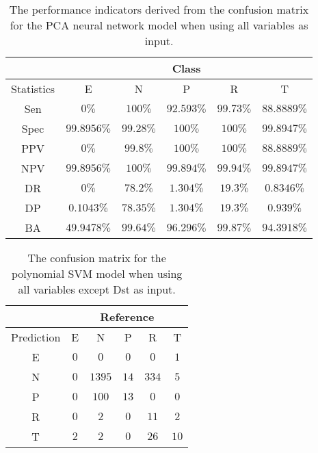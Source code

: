\begin{table}[!ht]
	\centering
	\begin{tabular}{|c|c|c|c|c|c|}
		\hline
		 & \multicolumn{5}{c|}{Class} \\ \hline
		Statistics & E & N & P & R & T \\ \hline
		Sen & $0\%$ & $100\%$ & $92.593\%$ & $99.73\%$ & $88.8889\%$ \\ \hline
		Spec & $99.8956\%$ & $99.28\%$ & $100\%$ & $100\%$ & $99.8947\%$ \\ \hline
		PPV & $0\%$ & $99.8\%$ & $100\%$ & $100\%$ & $88.8889\%$ \\ \hline
		NPV & $99.8956\%$ & $100\%$ & $99.894\%$ & $99.94\%$ & $99.8947\%$ \\ \hline
		DR & $0\%$ & $78.2\%$ & $1.304\%$ & $19.3\%$ & $0.8346\%$ \\ \hline
		DP & $0.1043\%$ & $78.35\%$ & $1.304\%$ & $19.3\%$ & $0.939\%$ \\ \hline
		BA & $49.9478\%$ & $99.64\%$ & $96.296\%$ & $99.87\%$ & $94.3918\%$ \\ \hline
	\end{tabular}
	\caption{The performance indicators derived from the confusion matrix for the PCA neural network model when using all variables as input.}
	\label{tab:cs:reverse:all:pcaNNet}
\end{table}

\begin{table}[!ht]
	\centering
	\begin{tabular}{|c|c|c|c|c|c|}
		\hline
		 & \multicolumn{5}{|c|}{Reference} \\ \hline
		 Prediction & E & N & P & R & T \\ \hline
		 E & $0$ & $0$ & $0$ & $0$ & $1$ \\ \hline
		 N & $0$ & $1395$ & $14$ & $334$ & $5$ \\ \hline
		 P & $0$ & $100$ & $13$ & $0$ & $0$ \\ \hline
		 R & $0$ & $2$ & $0$ & $11$ & $2$ \\ \hline
		 T & $2$ & $2$ & $0$ & $26$ & $10$ \\ \hline
	\end{tabular}
	\caption{The confusion matrix for the polynomial SVM model when using all variables except Dst as input.}
	\label{tab:cm:noDst:svmPoly}
\end{table}

